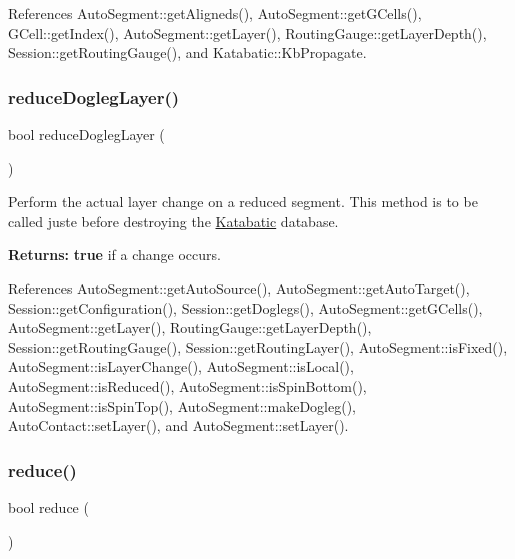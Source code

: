  

References Auto\+Segment\+::get\+Aligneds(), Auto\+Segment\+::get\+G\+Cells(), G\+Cell\+::get\+Index(), Auto\+Segment\+::get\+Layer(), Routing\+Gauge\+::get\+Layer\+Depth(), Session\+::get\+Routing\+Gauge(), and Katabatic\+::\+Kb\+Propagate.

\mbox{\label{classKatabatic_1_1AutoSegment_acecc9a1d55a271a4b1587d7872cfe133}} 
\subsubsection{\texorpdfstring{reduce\+Dogleg\+Layer()}{reduceDoglegLayer()}}
{\footnotesize\ttfamily bool reduce\+Dogleg\+Layer (\begin{DoxyParamCaption}{ }\end{DoxyParamCaption})}

Perform the actual layer change on a reduced segment. This method is to be called juste before destroying the \hyperlink{namespaceKatabatic}{Katabatic} database.

{\bfseries Returns\+:} {\bfseries true} if a change occurs. 

References Auto\+Segment\+::get\+Auto\+Source(), Auto\+Segment\+::get\+Auto\+Target(), Session\+::get\+Configuration(), Session\+::get\+Doglegs(), Auto\+Segment\+::get\+G\+Cells(), Auto\+Segment\+::get\+Layer(), Routing\+Gauge\+::get\+Layer\+Depth(), Session\+::get\+Routing\+Gauge(), Session\+::get\+Routing\+Layer(), Auto\+Segment\+::is\+Fixed(), Auto\+Segment\+::is\+Layer\+Change(), Auto\+Segment\+::is\+Local(), Auto\+Segment\+::is\+Reduced(), Auto\+Segment\+::is\+Spin\+Bottom(), Auto\+Segment\+::is\+Spin\+Top(), Auto\+Segment\+::make\+Dogleg(), Auto\+Contact\+::set\+Layer(), and Auto\+Segment\+::set\+Layer().

\mbox{\label{classKatabatic_1_1AutoSegment_a27a6a2c747ff93d209878a32d97e9157}} 
\subsubsection{\texorpdfstring{reduce()}{reduce()}}
{\footnotesize\ttfamily bool reduce (\begin{DoxyParamCaption}{ }\end{DoxyParamCaption})}

